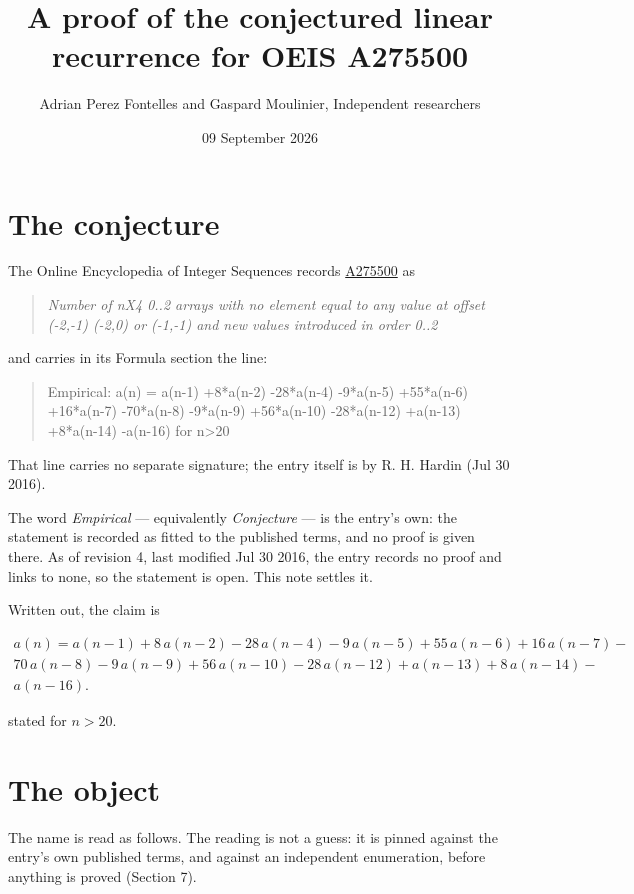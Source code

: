 \documentclass[11pt]{article}
\title{A proof of the conjectured linear recurrence for OEIS A275500}
\author{Adrian Perez Fontelles and Gaspard Moulinier, Independent researchers}
\date{09 September 2026}
\theoremstyle{definition}
\begin{document}
\maketitle
\section{The conjecture}

The Online Encyclopedia of Integer Sequences records \href{https://oeis.org/A275500}{A275500} as

\begin{quote}\itshape Number of nX4 0..2 arrays with no element equal to any value at offset (-2,-1) (-2,0) or (-1,-1) and new values introduced in order 0..2\end{quote}

and carries in its Formula section the line:

\begin{quote}\ttfamily Empirical: a(n) = a(n-1) +8*a(n-2) -28*a(n-4) -9*a(n-5) +55*a(n-6) +16*a(n-7) -70*a(n-8) -9*a(n-9) +56*a(n-10) -28*a(n-12) +a(n-13) +8*a(n-14) -a(n-16) for n>20\end{quote}

That line carries no separate signature; the entry itself is by R. H. Hardin (Jul 30 2016).

The word {\itshape Empirical} --- equivalently {\itshape Conjecture} --- is the entry's own: the statement is recorded as fitted to the published terms, and no proof is given there. As of revision 4, last modified Jul 30 2016, the entry records no proof and links to none, so the statement is open. This note settles it.

Written out, the claim is

\begin{multline*} a(n) = a(n-1) + 8\,a(n-2) - 28\,a(n-4) - 9\,a(n-5) + 55\,a(n-6) + 16\,a(n-7) - \\ 70\,a(n-8) - 9\,a(n-9) + 56\,a(n-10) - 28\,a(n-12) + a(n-13) + 8\,a(n-14) - \\ a(n-16). \end{multline*}

stated for $n > 20$.

\section{The object}

The name is read as follows. The reading is not a guess: it is pinned against the entry's own published terms, and against an independent enumeration, before anything is proved (Section 7).
\end{document}
